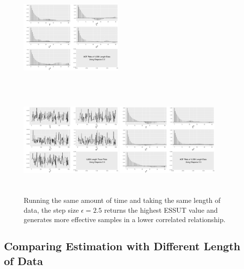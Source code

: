\begin{figure}[h]
\includegraphics[width=0.45\textwidth,height=5cm]{Chapters/05MCMCOU/plots/gg1k22acf.pdf}
\end{figure}
\begin{figure}[h]\ContinuedFloat
\centering
\includegraphics[width=0.45\textwidth,height=5cm]{Chapters/05MCMCOU/plots/gg1k25chain.pdf}
\includegraphics[width=0.45\textwidth,height=5cm]{Chapters/05MCMCOU/plots/gg1k25acf.pdf}
\caption{Running the same amount of time and taking the same length of data, the step size $\epsilon=2.5$ returns the highest ESSUT value and generates more effective samples in a lower correlated relationship. }\label{1koutof8kfigures}
\end{figure}



\clearpage

\subsection*{Comparing Estimation with Different Length of Data }


